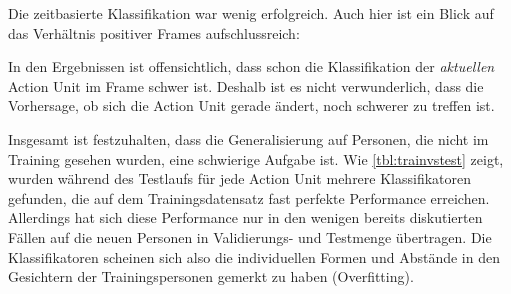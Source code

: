 Die zeitbasierte Klassifikation war wenig erfolgreich. Auch hier ist ein Blick
auf das Verhältnis positiver Frames aufschlussreich:

In den Ergebnissen ist offensichtlich, dass schon die Klassifikation der
\emph{aktuellen} Action Unit im Frame schwer ist. Deshalb ist es nicht verwunderlich,
dass die Vorhersage, ob sich die Action Unit gerade ändert, noch schwerer zu
treffen ist.

Insgesamt ist festzuhalten, dass die Generalisierung auf Personen, die nicht im
Training gesehen wurden, eine schwierige Aufgabe ist. Wie \cref{tbl:trainvstest}
zeigt, wurden während des Testlaufs für jede Action Unit mehrere Klassifikatoren
gefunden, die auf dem Trainingsdatensatz fast perfekte Performance erreichen.
Allerdings hat sich diese Performance nur in den wenigen bereits diskutierten Fällen
auf die neuen Personen in Validierungs- und Testmenge übertragen. Die
Klassifikatoren scheinen sich also die individuellen Formen und Abstände in den Gesichtern
der Trainingspersonen gemerkt zu haben (Overfitting).


